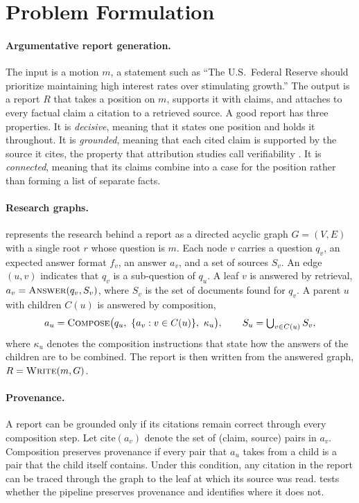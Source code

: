 \section{Problem Formulation}
\label{sec:problem}

\paragraph{Argumentative report generation.}
The input is a motion $m$, a statement such as ``The U.S.\ Federal Reserve should prioritize maintaining high interest rates over stimulating growth.'' The output is a report $R$ that takes a position on $m$, supports it with claims, and attaches to every factual claim a citation to a retrieved source. A good report has three properties. It is \emph{decisive}, meaning that it states one position and holds it throughout. It is \emph{grounded}, meaning that each cited claim is supported by the source it cites, the property that attribution studies call verifiability \citep{rashkin2023ais, liu2023verifiability}. It is \emph{connected}, meaning that its claims combine into a case for the position rather than forming a list of separate facts.

\paragraph{Research graphs.}
\sys{} represents the research behind a report as a directed acyclic graph $G = (V, E)$ with a single root $r$ whose question is $m$. Each node $v$ carries a question $q_v$, an expected answer format $f_v$, an answer $a_v$, and a set of sources $S_v$. An edge $(u, v)$ indicates that $q_v$ is a sub-question of $q_u$. A leaf $v$ is answered by retrieval, $a_v = \textsc{Answer}(q_v, S_v)$, where $S_v$ is the set of documents found for $q_v$. A parent $u$ with children $C(u)$ is answered by composition,
\begin{equation}
a_u = \textsc{Compose}\big(q_u,\ \{a_v : v \in C(u)\},\ \kappa_u\big), \qquad S_u = \textstyle\bigcup_{v \in C(u)} S_v,
\label{eq:compose}
\end{equation}
where $\kappa_u$ denotes the composition instructions that state how the answers of the children are to be combined. The report is then written from the answered graph, $R = \textsc{Write}(m, G)$.

\paragraph{Provenance.}
A report can be grounded only if its citations remain correct through every composition step. Let $\mathrm{cite}(a_v)$ denote the set of (claim, source) pairs in $a_v$. Composition preserves provenance if every pair that $a_u$ takes from a child is a pair that the child itself contains. Under this condition, any citation in the report can be traced through the graph to the leaf at which its source was read.  tests whether the pipeline preserves provenance and identifies where it does not.
